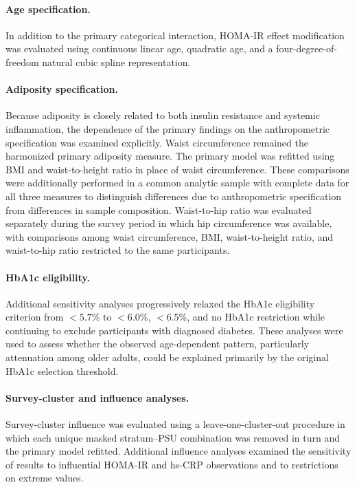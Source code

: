 \documentclass[11pt]{article}
\begin{document}
\paragraph{Age specification.}
In addition to the primary categorical interaction, HOMA-IR effect
modification was evaluated using continuous linear age, quadratic age,
and a four-degree-of-freedom natural cubic spline representation.

\paragraph{Adiposity specification.}
Because adiposity is closely related to both insulin resistance and
systemic inflammation, the dependence of the primary findings on the
anthropometric specification was examined explicitly. Waist circumference
remained the harmonized primary adiposity measure. The primary model was
refitted using BMI and waist-to-height ratio in place of waist circumference.
These comparisons were additionally performed in a common analytic sample
with complete data for all three measures to distinguish differences due to
anthropometric specification from differences in sample composition.
Waist-to-hip ratio was evaluated separately during the survey period in
which hip circumference was available, with comparisons among waist
circumference, BMI, waist-to-height ratio, and waist-to-hip ratio restricted
to the same participants.

\paragraph{HbA1c eligibility.}
Additional sensitivity analyses progressively relaxed the HbA1c eligibility
criterion from $<5.7\%$ to $<6.0\%$, $<6.5\%$, and no HbA1c restriction
while continuing to exclude participants with diagnosed diabetes. These
analyses were used to assess whether the observed age-dependent pattern,
particularly attenuation among older adults, could be explained primarily
by the original HbA1c selection threshold.

\paragraph{Survey-cluster and influence analyses.}
Survey-cluster influence was evaluated using a leave-one-cluster-out
procedure in which each unique masked stratum--PSU combination was removed
in turn and the primary model refitted. Additional influence analyses
examined the sensitivity of results to influential HOMA-IR and hs-CRP
observations and to restrictions on extreme values.
\end{document}
